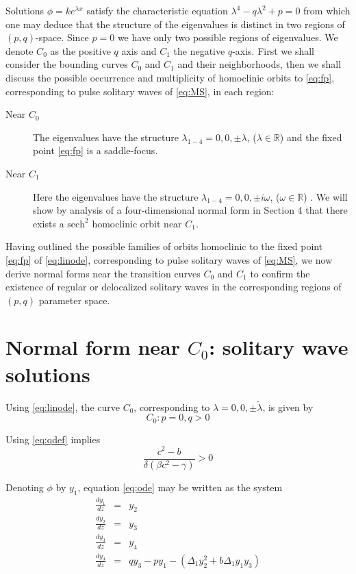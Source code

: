 Solutions $\phi = k e^{\lambda x}$ satisfy the characteristic equation
$\lambda^4 - q \lambda^2 + p = 0 $ from which one may deduce that the structure
of the eigenvalues is distinct in two regions of $\left(p,q\right)$-space.
Since $p=0$ we have only two possible regions of eigenvalues.  We denote $C_0$
as the positive $q$ axis and $C_1$ the negative $q$-axis. First we shall 
consider the bounding curves $C_0$ and $C_1$ and their neighborhoods, then we shall discuss the possible
occurrence and multiplicity of homoclinic orbits to \eqref{eq:fp}, corresponding
to pulse solitary waves of \eqref{eq:MS}, in each region:

\begin{description}
\item[Near $C_0$] 
The eigenvalues have the structure $\lambda_{1-4} = 0,0,\pm \lambda$, ($\lambda \in \mathbb{R}$) and the fixed point
\eqref{eq:fp} is a saddle-focus.
\item[Near $C_1$] 
Here the eigenvalues have the structure $\lambda_{1-4} = 0,0,\pm i \omega $, ($\omega \in \mathbb{R}$) . We will show by analysis of a
four-dimensional normal form in Section 4 that there exists a $\mathrm{sech}^2$ homoclinic orbit near $C_1$.
\end{description}

Having outlined the possible families of orbits homoclinic to the fixed point \eqref{eq:fp} of \eqref{eq:linode},
corresponding to pulse solitary waves of \eqref{eq:MS}, we now derive normal forms near the transition curves $C_0$ and $C_1$
to confirm the existence of regular or delocalized solitary waves in the corresponding regions of $\left(p,q\right)$ parameter space.

\section{Normal form near $C_0$: solitary wave solutions}

Using \eqref{eq:linode}, the curve $C_0$, corresponding to $\lambda = 0,0,\pm \tilde{ \lambda } $, is given by
\begin{equation}
C_0: { p=0, q > 0 }
\end{equation}

Using \eqref{eq:qdef} implies
\begin{equation}
 \frac{c^2 - b}{\delta\left(\beta c^2 - \gamma\right)} > 0
\end{equation}

Denoting $\phi$ by $y_1$, equation \eqref{eq:ode} may be written as the system
\begin{subequations}\label{eq:system}
\begin{eqnarray}
\frac{d y_1 }{d z} &=& y_2 \\
\frac{d y_2 }{d z} &=& y_3 \\
\frac{d y_3 }{d z} &=& y_4 \\
\frac{d y_4 }{d z} &=& q y_3 - p y_1 - \left(\Delta_1 y_2^2 + b \Delta_1 y_1 y_3 \right)
\end{eqnarray}
\end{subequations}

